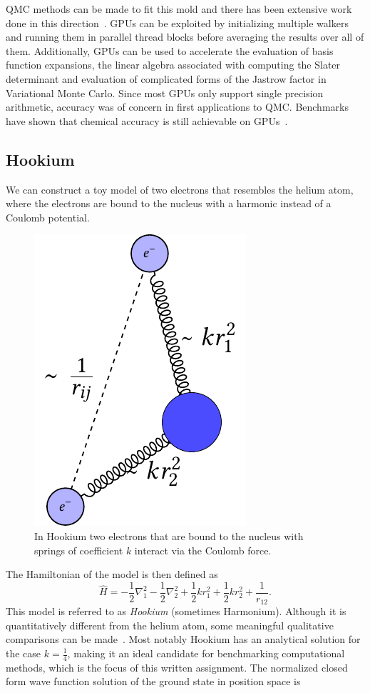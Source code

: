 \documentclass[final,3p,times,twocolumn]{elsarticle}
\begin{document}
	QMC methods can be made to fit this mold and there has been extensive work done in this direction~\cite{anderson2007quantum, meredith2009accuracy, esler2010accelerating}. GPUs can be exploited by initializing multiple walkers and running them in parallel thread blocks before averaging the results over all of them. Additionally, GPUs can be used to accelerate the evaluation of basis function expansions, the linear algebra associated with computing the Slater determinant and evaluation of complicated forms of the Jastrow factor in Variational Monte Carlo. Since most GPUs only support single precision arithmetic, accuracy was of concern in first applications to QMC. Benchmarks have shown that chemical accuracy is still achievable on GPUs~\cite{anderson2007quantum, meredith2009accuracy}. 
	
	
	\subsection{Hookium}
	We can construct a toy model of two electrons that resembles the helium atom, where the electrons are bound to the nucleus with a harmonic instead of a Coulomb potential. 
	\begin{figure}[h]
		\centering
		\includegraphics[width=0.35\linewidth]{../diagrams/Hookium/Hookium_diagram}
		\caption{In Hookium two electrons that are bound to the nucleus with springs of coefficient $k$ interact via the Coulomb force.}
		\label{fig:Hookiumdiagram}
	\end{figure}
	The Hamiltonian of the model is then defined as 
	\begin{equation}
		\hat{H}=-\frac{1}{2} \nabla_{1}^{2}-\frac{1}{2} \nabla_{2}^{2}+\frac{1}{2} k r_{1}^{2}+\frac{1}{2} k r_{2}^{2}+\frac{1}{r_{12}}.
	\end{equation}
	This model is referred to as \emph{Hookium} (sometimes Harmonium). Although it is quantitatively different from the helium atom, some meaningful qualitative comparisons can be made~\cite{ONeill2003wave}. Most notably Hookium has an analytical solution for the case $k=\frac{1}{4}$, making it an ideal candidate for benchmarking computational methods, which is the focus of this written assignment. The normalized closed form wave function solution of the ground state in position space is
\end{document}
